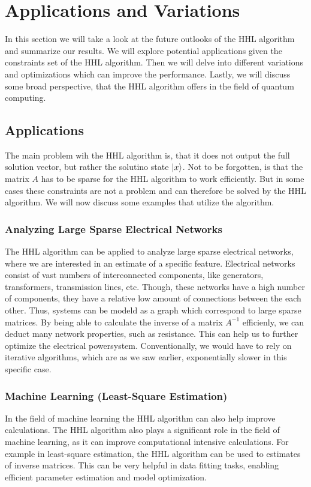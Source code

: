 \section{Applications and Variations} 
In this section we will take a look at the future outlooks of the HHL algorithm and summarize our results.
We will explore potential applications given the constraints set of the HHL algorithm.
Then we will delve into different variations and optimizations which can improve the performance. 
Lastly, we will discuss some broad perspective, that the HHL algorithm offers in the field of quantum computing. 

\subsection{Applications}
The main problem wih the HHL algorithm is, that it does not output the full solution vector, but rather the solutino state $\ket x$.
Not to be forgotten, is that the matrix $A$ has to be sparse for the HHL algorithm to work efficiently.
But in some cases these constraints are not a problem and can therefore be solved by the HHL algorithm.
We will now discuss some examples that utilize the algorithm. 


    \subsubsection{Analyzing Large Sparse Electrical Networks}
    The HHL algorithm can be applied to analyze large sparse electrical networks, where we are interested in an estimate of a specific feature.
    Electrical networks consist of vast numbers of interconnected components, like generators, transformers, transmission lines, etc. 
    Though, these networks have a high number of components, they have a relative low amount of connections between the each other.
    Thus, systems can be modeld as a graph which correspond to large sparse matrices.
    By being able to calculate the inverse of a matrix $A^{-1}$ efficienly, we can deduct many network properties, such as resistance. 
    This can help us to further optimize the electrical powersystem.
    Conventionally, we would have to rely on iterative algorithms, which are as we saw earlier, exponentially slower in this specific case.
    
    \subsubsection{Machine Learning (Least-Square Estimation)}
    In the field of machine learning the HHL algorithm can also help improve calculations. 
    The HHL algorithm also plays a significant role in the field of machine learning, as it can improve computational intensive calculations.
    For example in least-square estimation, the HHL algorithm can be used to estimates of inverse matrices. 
    This can be very helpful in data fitting tasks, enabling efficient parameter estimation and model optimization.
    
